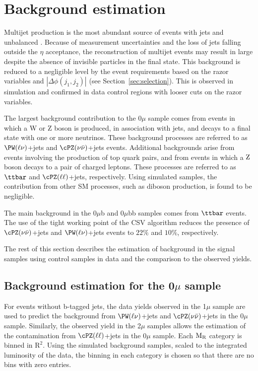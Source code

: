 {{\section{Background estimation}\label{sec:bkg}

Multijet production is the most abundant source of events with jets
and unbalanced \pt. Because of measurement uncertainties and the loss
of jets falling outside the $\eta$ acceptance, the reconstruction
of multijet events may result in large \MET despite the absence of
invisible particles in the final state. This background is reduced to
a negligible level by the event requirements based on the razor variables and $\left| \Delta\phi (j_{1}, j_{2}) \right|$ (see
Section~\ref{sec:selection}). This is observed in simulation and
confirmed in data control regions with looser cuts on the razor variables.

The largest background contribution to the 0$\mu$ sample comes from events in which a W or Z boson is
produced, in association with jets, and decays to a final state with one or more neutrinos. These
background processes are referred to as $\mathrm{\PW}(\ell\nu)$+jets
and $\mathrm{\cPZ}(\nu\bar{\nu})$+jets events. Additional backgrounds arise from events involving the production of top quark pairs, and from
events in which a $\rm{Z}$ boson decays to a pair of charged
leptons. These processes are referred to as $\ttbar$ and
$\mathrm{\cPZ}(\ell \ell)$+jets, respectively. Using
simulated samples, the contribution from other SM processes, such as
diboson production, is found to be negligible.

The main background in the 0$\mu$b and 0$\mu$bb samples comes from
$\ttbar$ events. The use of the tight working point of the CSV
algorithm reduces the presence of $\cPZ(\nu\bar{\nu})$+jets
and $\PW(\ell\nu)$+jets events to $22\%$ and $10\%$, respectively.

The rest of this section describes the estimation of background in the signal samples using control samples in data and the comparison to the
observed yields.

\subsection{Background estimation for the 0$\mu$ sample}

For events without b-tagged jets, the data yields observed in the
1$\mu$ sample are used to predict the background from $\PW(\ell\nu)$+jets and
$\cPZ(\nu\bar{\nu})$+jets in the 0$\mu$ sample.  Similarly, the
observed yield in the 2$\mu$ samples allows the estimation of
the contamination from $\mathrm{\cPZ}(\ell \ell)$+jets in the 0$\mu$ sample. Each
$\mathrm{M_{\rm R}}$ category is binned in $\mathrm{R^2}$. Using the simulated background samples, scaled to the
integrated luminosity of the data, the binning in each category is
chosen so that there are no bins with zero entries. 

}}
